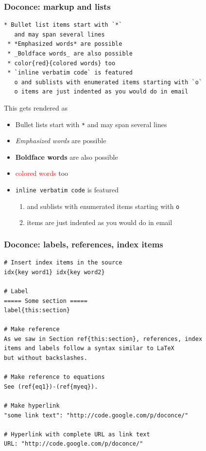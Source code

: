 \documentclass{beamer}
\begin{document}
\begin{frame}
\frametitle{Doconce: markup and lists}

\begin{Verbatim}[numbers=none,fontsize=\fontsize{9pt}{9pt},baselinestretch=0.95]
 * Bullet list items start with `*`
   and may span several lines
 * *Emphasized words* are possible
 * _Boldface words_ are also possible
 * color{red}{colored words} too
 * `inline verbatim code` is featured
   o and sublists with enumerated items starting with `o`
   o items are just indented as you would do in email
\end{Verbatim}

This gets rendered as

\begin{itemize}
 \item Bullet lists start with \Verb!*!
   and may span several lines

 \item \emph{Emphasized words} are possible

 \item \textbf{Boldface words} are also possible

 \item \textcolor{red}{colored words} too

 \item \Verb!inline verbatim code! is featured
\begin{enumerate}

  \item and sublists with enumerated items starting with \Verb!o!

  \item items are just indented as you would do in email
\end{enumerate}

\noindent
\end{itemize}

\noindent
\end{frame}

\begin{frame}
\frametitle{Doconce: labels, references, index items}

\begin{Verbatim}[numbers=none,fontsize=\fontsize{9pt}{9pt},baselinestretch=0.95]
# Insert index items in the source
idx{key word1} idx{key word2}

# Label
===== Some section =====
label{this:section}

# Make reference
As we saw in Section ref{this:section}, references, index
items and labels follow a syntax similar to LaTeX
but without backslashes.

# Make reference to equations
See (ref{eq1})-(ref{myeq}).

# Make hyperlink
"some link text": "http://code.google.com/p/doconce/"

# Hyperlink with complete URL as link text
URL: "http://code.google.com/p/doconce/"
\end{Verbatim}
\end{frame}
\end{document}
